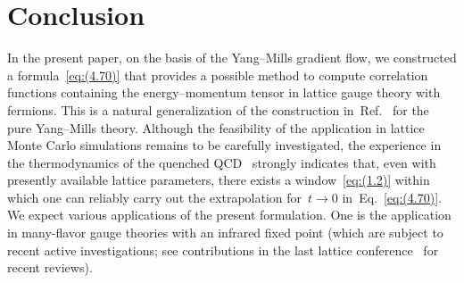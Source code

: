 \section{Conclusion}
\label{sec:6}
In the present paper, on the basis of the Yang--Mills gradient flow, we
constructed a formula~\eqref{eq:(4.70)} that provides a possible method to
compute correlation functions containing the energy--momentum tensor in lattice
gauge theory with fermions. This is a natural generalization of the
construction in~Ref.~\cite{Suzuki:2013gza} for the pure Yang--Mills theory.
Although the feasibility of the application in lattice Monte Carlo simulations
remains to be carefully investigated, the experience in the thermodynamics of
the quenched QCD~\cite{Asakawa:2013laa} strongly indicates that, even with
presently available lattice parameters, there exists a window~\eqref{eq:(1.2)}
within which one can reliably carry out the extrapolation for~$t\to0$
in~Eq.~\eqref{eq:(4.70)}. We expect various applications of the present
formulation. One is the application in many-flavor gauge theories with an
infrared fixed point (which are subject to recent active investigations; see
contributions in the last lattice conference~\cite{Itou:2013faa,Fodor:2014pqa}
for recent reviews).
